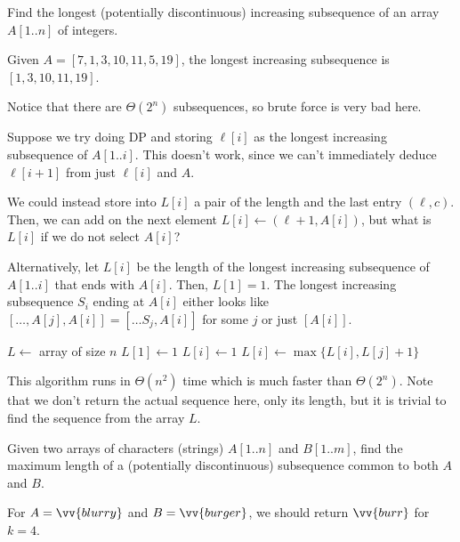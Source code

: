 \begin{problem}
  Find the longest (potentially discontinuous)
  increasing subsequence of an array $A[1..n]$ of integers.
\end{problem}
\begin{example}
  Given $A = [7,1,3,10,11,5,19]$, the longest increasing subsequence is
  $[1,3,10,11,19]$.
\end{example}

Notice that there are $\Theta(2^n)$ subsequences, so brute force is very bad here.

Suppose we try doing DP and storing $\ell[i]$ as the longest increasing subsequence of $A[1..i]$.
This doesn't work, since we can't immediately deduce $\ell[i+1]$ from just $\ell[i]$ and $A$.

We could instead store into $L[i]$ a pair of the length and the last entry $(\ell, c)$.
Then, we can add on the next element $L[i] \gets (\ell + 1, A[i])$,
but what is $L[i]$ if we do not select $A[i]$?

Alternatively, let $L[i]$ be the length of the longest increasing subsequence
of $A[1..i]$ that ends with $A[i]$. Then, $L[1] = 1$.
The longest increasing subsequence $S_i$ ending at $A[i]$
either looks like $[\dotsc,A[j],A[i]] = [\dots S_j, A[i]]$ for some $j$
or just $[A[i]]$.

\begin{algorithm}[H]
  \caption{}
  \begin{algorithmic}[1]
    \State $L \gets$ array of size $n$
    \State $L[1] \gets 1$
    \State $L[i] \gets 1$ 
     
    \State $L[i] \gets \max\{L[i], L[j] + 1\}$
    \EndIf
    \EndFor
    \EndFor
    \State {}
  \end{algorithmic}
\end{algorithm}

This algorithm runs in $\Theta(n^2)$ time which is much faster than $\Theta(2^n)$.
Note that we don't return the actual sequence here, only its length,
but it is trivial to find the sequence from the array $L$.

\begin{problem}
  Given two arrays of characters (strings) $A[1..n]$ and $B[1..m]$,
  find the maximum length of a (potentially discontinuous) subsequence
  common to both $A$ and $B$.
\end{problem}
\begin{example}
  For $A = \vv{blurry}$ and $B = \vv{burger}$, we should return $\vv{burr}$ for $k=4$.
\end{example}

